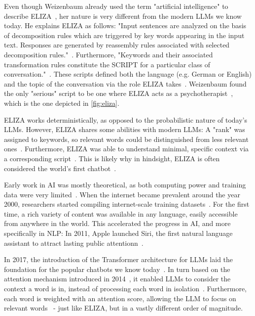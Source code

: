 Even though Weizenbaum already used the term "artificial intelligence" to describe ELIZA~\cite{weizenbaumELIZAComputerProgram1966}, her nature is very different from the modern \glspl{LLM} we know today. He explains ELIZA as follows: "Input sentences are analyzed on the basis of decomposition rules which are triggered by key words appearing in the input text. Responses are generated by reassembly rules associated with selected decomposition rules."~\cite{weizenbaumELIZAComputerProgram1966}. Furthermore, "Keywords and their associated transformation rules constitute the SCRIPT for a particular class of conversation."~\cite{weizenbaumELIZAComputerProgram1966}. These scripts defined both the language (e.g. German or English) and the topic of the conversation via the role ELIZA takes~\cite{weizenbaumELIZAComputerProgram1966}. Weizenbaum found the only "serious" script to be one where ELIZA acts as a psychotherapist~\cite{weizenbaumELIZAComputerProgram1966}, which is the one depicted in \cref{fig:eliza}.

ELIZA works deterministically, as opposed to the probabilistic nature of today's \glspl{LLM}. However, ELIZA shares some abilities with modern \glspl{LLM}: A "rank" was assigned to keywords, so relevant words could be distinguished from less relevant ones~\cite{weizenbaumELIZAComputerProgram1966}. Furthermore, ELIZA was able to understand minimal, specific context via a corresponding script~\cite{weizenbaumELIZAComputerProgram1966}. This is likely why in hindsight, ELIZA is often considered the world's first chatbot~\cite{berryLimitsComputationJoseph2023,shragerELIZAReinterpretedWorlds2024,wangELIZAChatGPTBrief2024}.

Early work in \gls{AI} was mostly theoretical, as both computing power and training data were very limited~\cite{shragerELIZAReinterpretedWorlds2024}. When the internet became prevalent around the year 2000, researchers started compiling internet-scale training datasets~\cite{bankoScalingVeryVery2001,resnikWebParallelCorpus2003,kilgarriffIntroductionSpecialIssue2003}. For the first time, a rich variety of content was available in any language, easily accessible from anywhere in the world. This accelerated the progress in \gls{AI}, and more specifically in \gls{NLP}: In 2011, Apple launched Siri, the first natural language assistant to attract lasting public attentionn~\cite{wangELIZAChatGPTBrief2024}.

In 2017, the introduction of the Transformer architecture for \glspl{LLM} laid the foundation for the popular chatbots we know today~\cite{vaswaniAttentionAllYou2023}. In turn based on the attention mechanism introduced in 2014~\cite{bahdanauNeuralMachineTranslation2016}, it enabled \glspl{LLM} to consider the context a word is in, instead of processing each word in isolation~\cite{vaswaniAttentionAllYou2023,bahdanauNeuralMachineTranslation2016}. Furthermore, each word is weighted with an attention score, allowing the \gls{LLM} to focus on relevant words~\cite{vaswaniAttentionAllYou2023,bahdanauNeuralMachineTranslation2016} - just like ELIZA, but in a vastly different order of magnitude.

